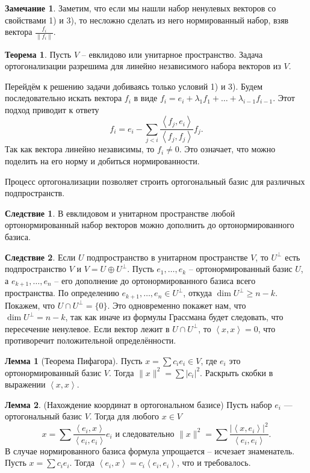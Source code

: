 \documentclass[10pt,a4paper,oneside]{book} %
\theoremstyle{definition}
\newtheorem*{rem}{Замечание}
\newtheorem{thm}{Теорема}
\newtheorem{lem}{Лемма}
\newtheorem{cor}{Следствие}
\def\lan{\left\langle }
\def\ran{\right\rangle}
\def\thrm{\begin{thm}}
\def\ethrm{\end{thm}}
\def\lm{\begin{lem}}
\def\elm{\end{lem}}
\def\crl{\begin{cor}}
\def\ecrl{\end{cor}}
\def\rm{\begin{rem}}
\def\erm{\end{rem}}
\begin{document}
\rm Заметим, что если мы нашли набор ненулевых векторов со свойствами 1) и 3), то несложно сделать из него нормированный набор, взяв вектора $\frac{f_i}{\|f_i\|}$. 
\erm

\thrm Пусть $V$ -- евклидово или унитарное пространство. Задача ортогонализации разрешима для линейно независимого набора векторов из $V$.
\proof

Перейдём к решению задачи добиваясь только условий 1) и 3). Будем последовательно искать вектора $f_i$ в виде $f_i=e_i+\lambda_1 f_1 +\dots + \lambda_{i-1} f_{i-1}$. Этот подход приводит к ответу
$$f_i=e_i-\sum_{j<i} \frac{\lan f_j,e_i\ran}{\lan f_j,f_j\ran}f_j.$$
Так как вектора линейно независимы, то $f_i\neq 0$. Это означает, что можно поделить на его норму и добиться нормированности.
\endproof
\ethrm


Процесс ортогонализации позволяет строить ортогональный базис для различных подпространств.

\crl В евклидовом и унитарном пространстве любой ортонормированный набор векторов можно дополнить до ортонормированного базиса.
\ecrl

\crl Если $U$ подпространство в унитарном пространстве $V$, то $U^{\bot}$ есть подпространство $V$ и  $V= U \oplus U^{\bot}$. 
\proof Пусть $e_1,\dots,e_k$ -- ортонормированный базис $U$, а $e_{k+1}, \dots, e_n$ -- его дополнение до ортонормированного базиса всего пространства. По определению $e_{k+1},\dots,e_n \in U^{\bot}$, откуда $\dim U^{\bot} \geq n-k$. Покажем, что $U\cap U^{\bot}=\{0\}$. Это одновременно покажет нам, что $\dim U^{\bot}=n-k$, так как иначе из формулы Грассмана будет следовать, что пересечение ненулевое.
Если вектор лежит в $U\cap U^{\bot}$, то $\lan x,x\ran=0$, что противоречит положительной определённости.
\endproof
\ecrl

\lm[Теорема Пифагора] Пусть $x= \sum c_i e_i \in V$, где $e_i$ это ортонормированный базис $V$. Тогда $\|x\|^2=\sum |c_i|^2$.
\proof Раскрыть скобки в выражении $\lan x,x\ran$.
\endproof
\elm

\lm(Нахождение координат в ортогональном базисе) Пусть набор $e_i$ --- ортогональный базис $V$. Тогда для любого $x\in V$ 
$$x= \sum \frac{\lan e_i,  x\ran}{\lan e_i, e_i\ran}e_i \text{ и следовательно  } \|x\|^2= \sum \frac{|\lan x, e_i\ran|^2}{\lan e_i, e_i\ran}.$$
 В случае нормированного базиса формула упрощается -- исчезает знаменатель.
\proof Пусть $x=\sum c_i e_i$. Тогда $\lan e_i, x\ran = c_i \lan e_i,e_i \ran$, что и требовалось.
\endproof
\elm
\end{document}
